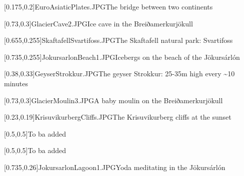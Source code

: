 



\graphicspath{{Figures/}{Figures/Iceland/}}


\subtitle{Day 2}
\date{27.10.2019}


    
    [0.175,0.2]{EuroAsiaticPlates.JPG}{The bridge between two continents}
    
    [0.73,0.3]{GlacierCave2.JPG}{Ice cave in the Breiðamerkurj\"okull}
    
    [0.655,0.255]{SkaftafellSvartifoss.JPG}{The Skaftafell natural park: Svartifoss}
    
    [0.735,0.255]{JokursarlonBeach1.JPG}{Icebergs on the beach of the J\"okurs\'arl\'on}
    
    [0.38,0.33]{GeyserStrokkur.JPG}{The geyser Strokkur: 25-35m high every \textasciitilde10 minutes}
    
    [0.73,0.3]{GlacierMoulin3.JPG}{A baby moulin on the Breiðamerkurj\"okull}
    
    [0.23,0.19]{KrisuvikurbergCliffs.JPG}{The Krisuvikurberg cliffs at the sunset}
    
    
    [0.5,0.5]{}{To ba added}
    
    [0.5,0.5]{}{To ba added}
    
    [0.735,0.26]{JokursarlonLagoon1.JPG}{Yoda meditating in the J\"okurs\'arl\'on}
    

